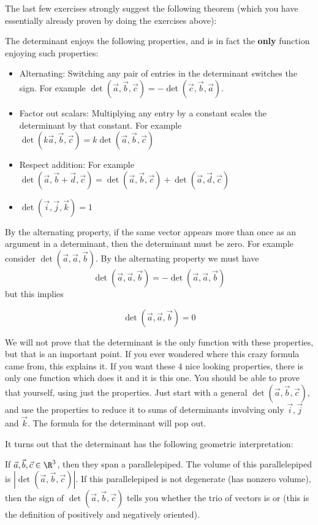 The last few exercises strongly suggest the following theorem (which you have essentially already proven by doing the exercises above):
	
\begin{theorem}
  The determinant enjoys the following properties, and is in fact the
  \textbf{only} function enjoying such properties:
  
  \begin{itemize}
  \item Alternating: Switching any pair of entries in the determinant
    switches the sign.  For example $\det(\vec{a},\vec{b},\vec{c}) =
    -\det(\vec{c},\vec{b},\vec{a})$.
  \item Factor out scalars: Multiplying any entry by a constant scales
    the determinant by that constant.  For example
    $\det(k\vec{a},\vec{b},\vec{c}) = k\det(\vec{a},\vec{b},\vec{c})$
  \item Respect addition: For example
    $\det(\vec{a},\vec{b}+\vec{d},\vec{c}) =
    \det(\vec{a},\vec{b},\vec{c}) +\det(\vec{a},\vec{d},\vec{c}) $
  \item $\det(\vec{i},\vec{j},\vec{k}) = 1 $
  \end{itemize}
\end{theorem}

\begin{observation}
  By the alternating property, if the same vector appears more than
  once as an argument in a determinant, then the determinant must be
  zero.  For example consider $\det(\vec{a},\vec{a},\vec{b})$. By the
  alternating property we must have
  \[
  \det(\vec{a},\vec{a},\vec{b}) = -\det(\vec{a},\vec{a},\vec{b})
  \]
  but this implies 
  
  \[
  \det(\vec{a},\vec{a},\vec{b})=0
  \]
\end{observation}
	
We will not prove that the determinant is the only function with these
properties, but that is an important point.  If you ever wondered
where this crazy formula came from, this explains it.  If you want
these $4$ nice looking properties, there is only one function which
does it and it is this one.  You should be able to prove that
yourself, using just the properties.  Just start with a general
$\det(\vec{a},\vec{b},\vec{c}) $, and use the properties to reduce it
to sums of determinants involving only $\vec{i},\vec{j}$ and
$\vec{k}$.  The formula for the determinant will pop out.
	
It turns out that the determinant has the following geometric
interpretation:
\begin{theorem}
  If $\vec{a},\vec{b},\vec{c} \in \R^3$, then they span a
  parallelepiped. The volume of this parallelepiped is
  $\left|\det(\vec{a},\vec{b},\vec{c})\right|$. If this parallelepiped
  is not degenerate (has nonzero volume), then the sign of
  $\det(\vec{a},\vec{b},\vec{c})$ tells you whether the trio of
  vectors is  or 
  (this is the definition of positively and negatively oriented).
\end{theorem} 
	

